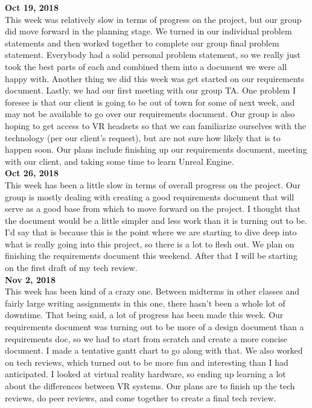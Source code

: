 \textbf{Oct 19, 2018}\\
This week was relatively slow in terms of progress on the project, but our group did move forward in the planning stage. We turned in our individual problem statements and then worked together to complete our group final problem statement. Everybody had a solid personal problem statement, so we really just took the best parts of each and combined them into a document we were all happy with. Another thing we did this week was get started on our requirements document. Lastly, we had our first meeting with our group TA.
One problem I foresee is that our client is going to be out of town for some of next week, and may not be available to go over our requirements document. Our group is also hoping to get access to VR headsets so that we can familiarize ourselves with the technology (per our client’s request), but are not sure how likely that is to happen soon.
Our plans include finishing up our requirements document, meeting with our client, and taking some time to learn Unreal Engine.\\

\textbf{Oct 26, 2018}\\
This week has been a little slow in terms of overall progress on the project. Our group is mostly dealing with creating a good requirements document that will serve as a good base from which to move forward on the project. I thought that the document would be a little simpler and less work than it is turning out to be. I'd say that is because this is the point where we are starting to dive deep into what is really going into this project, so there is a lot to flesh out. We plan on finishing the requirements document this weekend. After that I will be starting on the first draft of my tech review.\\

\textbf{Nov 2, 2018}\\
This week has been kind of a crazy one. Between midterms in other classes and fairly large writing assignments in this one, there hasn't been a whole lot of downtime. That being said, a lot of progress has been made this week. Our requirements document was turning out to be more of a design document than a requirements doc, so we had to start from scratch and create a more concise document. I made a tentative gantt chart to go along with that. We also worked on tech reviews, which turned out to be more fun and interesting than I had anticipated. I looked at virtual reality hardware, so ending up learning a lot about the differences between VR systems.
Our plans are to finish up the tech reviews, do peer reviews, and come together to create a final tech review.\\

